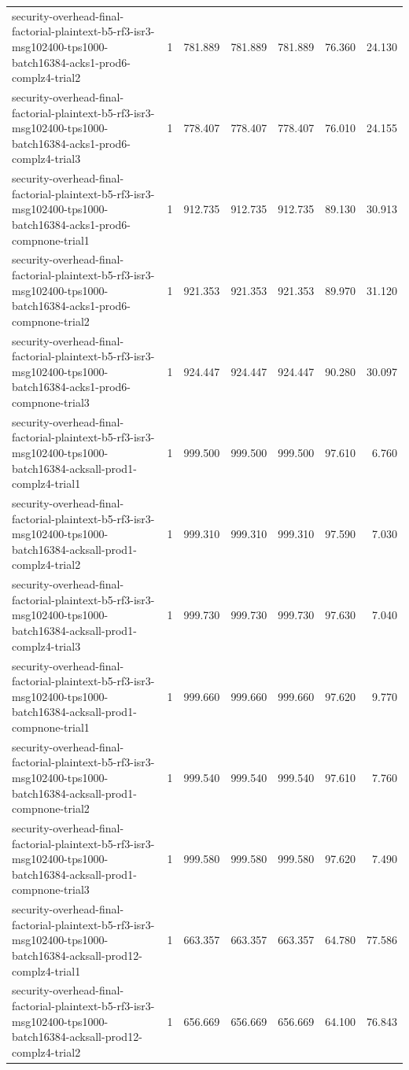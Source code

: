 \begin{tabular}{lrrrrrr}
security-overhead-final-factorial-plaintext-b5-rf3-isr3-msg102400-tps1000-batch16384-acks1-prod6-complz4-trial2 & 1 & 781.889 & 781.889 & 781.889 & 76.360 & 24.130 \\
security-overhead-final-factorial-plaintext-b5-rf3-isr3-msg102400-tps1000-batch16384-acks1-prod6-complz4-trial3 & 1 & 778.407 & 778.407 & 778.407 & 76.010 & 24.155 \\
security-overhead-final-factorial-plaintext-b5-rf3-isr3-msg102400-tps1000-batch16384-acks1-prod6-compnone-trial1 & 1 & 912.735 & 912.735 & 912.735 & 89.130 & 30.913 \\
security-overhead-final-factorial-plaintext-b5-rf3-isr3-msg102400-tps1000-batch16384-acks1-prod6-compnone-trial2 & 1 & 921.353 & 921.353 & 921.353 & 89.970 & 31.120 \\
security-overhead-final-factorial-plaintext-b5-rf3-isr3-msg102400-tps1000-batch16384-acks1-prod6-compnone-trial3 & 1 & 924.447 & 924.447 & 924.447 & 90.280 & 30.097 \\
security-overhead-final-factorial-plaintext-b5-rf3-isr3-msg102400-tps1000-batch16384-acksall-prod1-complz4-trial1 & 1 & 999.500 & 999.500 & 999.500 & 97.610 & 6.760 \\
security-overhead-final-factorial-plaintext-b5-rf3-isr3-msg102400-tps1000-batch16384-acksall-prod1-complz4-trial2 & 1 & 999.310 & 999.310 & 999.310 & 97.590 & 7.030 \\
security-overhead-final-factorial-plaintext-b5-rf3-isr3-msg102400-tps1000-batch16384-acksall-prod1-complz4-trial3 & 1 & 999.730 & 999.730 & 999.730 & 97.630 & 7.040 \\
security-overhead-final-factorial-plaintext-b5-rf3-isr3-msg102400-tps1000-batch16384-acksall-prod1-compnone-trial1 & 1 & 999.660 & 999.660 & 999.660 & 97.620 & 9.770 \\
security-overhead-final-factorial-plaintext-b5-rf3-isr3-msg102400-tps1000-batch16384-acksall-prod1-compnone-trial2 & 1 & 999.540 & 999.540 & 999.540 & 97.610 & 7.760 \\
security-overhead-final-factorial-plaintext-b5-rf3-isr3-msg102400-tps1000-batch16384-acksall-prod1-compnone-trial3 & 1 & 999.580 & 999.580 & 999.580 & 97.620 & 7.490 \\
security-overhead-final-factorial-plaintext-b5-rf3-isr3-msg102400-tps1000-batch16384-acksall-prod12-complz4-trial1 & 1 & 663.357 & 663.357 & 663.357 & 64.780 & 77.586 \\
security-overhead-final-factorial-plaintext-b5-rf3-isr3-msg102400-tps1000-batch16384-acksall-prod12-complz4-trial2 & 1 & 656.669 & 656.669 & 656.669 & 64.100 & 76.843 \\

\end{tabular}
